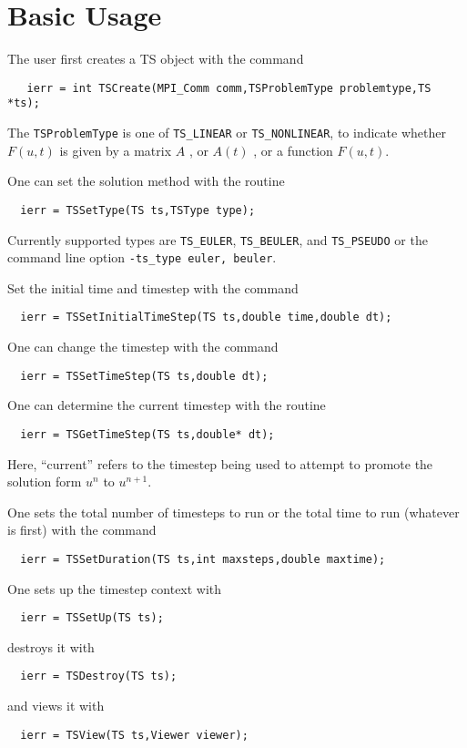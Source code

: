 \section{Basic Usage}

The user first creates a TS object with the command
\begin{verbatim}
   ierr = int TSCreate(MPI_Comm comm,TSProblemType problemtype,TS *ts);
\end{verbatim}
 The {\tt TSProblemType} 
is one of {\tt TS\_LINEAR} or {\tt TS\_NONLINEAR},
to indicate whether $ F(u,t) $ is given by a matrix $ A $ , or $ A(t) $ , or a
function $ F(u,t). $

One can set the solution method with the routine
\begin{verbatim}
  ierr = TSSetType(TS ts,TSType type);
\end{verbatim}
 Currently supported types are {\tt TS\_EULER},
{\tt TS\_BEULER}, and {\tt TS\_PSEUDO}
  
or the command line option
{\tt -ts\_type euler, beuler}.  


Set the initial time and timestep with the command
\begin{verbatim}
  ierr = TSSetInitialTimeStep(TS ts,double time,double dt);
\end{verbatim}
One  can change the timestep with the command
\begin{verbatim}
  ierr = TSSetTimeStep(TS ts,double dt);
\end{verbatim}
One  
can  determine the current timestep with the routine
\begin{verbatim}
  ierr = TSGetTimeStep(TS ts,double* dt);
\end{verbatim}
Here, ``current'' refers to the timestep being used to attempt to
promote the solution form $ u^n $ to $ u^{n+1}. $

One sets the total number of timesteps to run or the total time to run 
(whatever is first) with the command 
\begin{verbatim}
  ierr = TSSetDuration(TS ts,int maxsteps,double maxtime);
\end{verbatim}
One sets up the timestep context with 
\begin{verbatim}
  ierr = TSSetUp(TS ts);
\end{verbatim}
destroys it with 
\begin{verbatim}
  ierr = TSDestroy(TS ts);
\end{verbatim}
and views it with 
\begin{verbatim}
  ierr = TSView(TS ts,Viewer viewer);
\end{verbatim}

